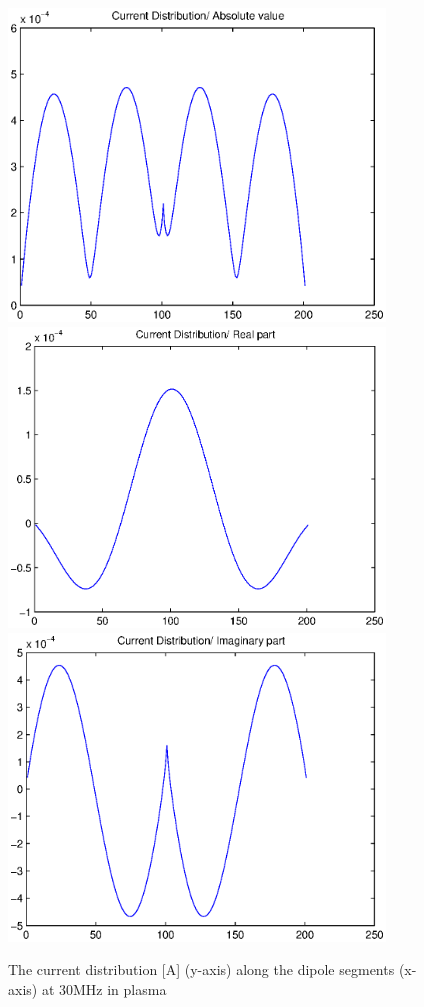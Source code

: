 \documentclass[a4paper,11pt]{thesis}
\begin{document}
\begin{figure}
 \begin{center}
\includegraphics[width=10.0cm]{DissPics/curr_abs_30mh_p.eps}
 \includegraphics[width=10.0cm]{DissPics/curr_re_30mh_p.eps}
 \includegraphics[width=10.0cm]{DissPics/curr_im_30mh_p.eps}\end{center}
  \caption{The current distribution [A] (y-axis) along the dipole segments (x-axis) at 30MHz in plasma}\label{fig:curr_30mh_pl}
\end{figure}
\end{document}
